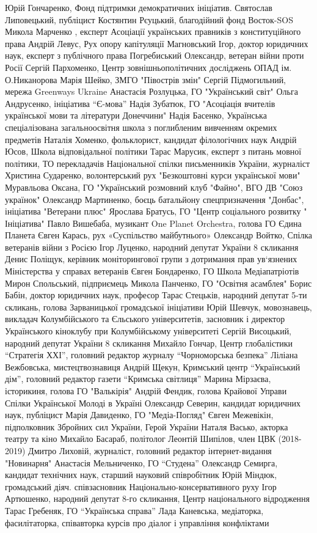 Юрій Гончаренко, Фонд підтримки демократичних ініціатив.
Святослав Липовецький, публіцист
Костянтин Рєуцький, благодійний фонд Восток-SOS
Микола Марченко , експерт Асоціації українських правників з конституційного права
Андрій Левус, Рух опору капітуляції
Магновський Ігор, доктор юридичних наук, експерт з публічного права
Погребиський Олександр, ветеран війни проти Росії
Сергій Пархоменко, Центр зовнішньополітичних досліджень ОПАД ім. О.Никанорова
Марія Шейко, ЗМГО "Півострів змін"
Сергій Підмогильний, мережа Greenways Ukraine
Анастасія Розлуцька, ГО "Український світ"
Ольга Андрусенко, ініціатива “Є-мова”
Надія Зубатюк, ГО "Асоціація вчителів української мови та літератури Донеччини"
Надія Басенко, Українська спеціалізована загальноосвітня школа з поглибленим вивченням окремих предметів
Наталія Хоменко, фольклорист, кандидат філологічних наук
Андрій Юсов, Школа відповідальної політики
Тарас Марусик, експерт з питань мовної політики, ТО перекладачів Національної спілки письменників України, журналіст
Христина Сударенко, волонтерський рух "Безкоштовні курси української мови"
Муравльова Оксана, ГО "Український розмовний клуб "Файно", ВГО ДВ "Союз українок"
Олександр Мартиненко, боєць батальйону спецпризначення "Донбас", ініціатива "Ветерани плюс"
Ярослава Братусь, ГО "Центр соціального розвитку " Ініціатива"
Павло Вишебаба, музикант One Planet Orchestra, голова ГО Єдина Планета
Євген Карась, рух «Суспільство майбутнього»
Олександр Войтко, Спілка ветеранів війни з Росією
Ігор Луценко, народний депутат України 8 скликання
Денис Поліщук, керівник моніторингової групи з дотримання прав ув‘язнених Міністерства у справах ветеранів
Євген Бондаренко, ГО Школа Медіапатріотів
Мирон Спольський, підприємець
Микола Панченко, ГО "Освітня асамблея"
Борис Бабін, доктор юридичних наук, професор
Тарас Стецьків, народний депутат 5-ти скликань, голова Зарваницької громадської ініціативи
Юрій Шевчук, мовознавець, викладач Колумбійського та Єльського університетів, засновник і директор Українського кіноклубу при Колумбійському університеті
Сергій Висоцький, народний депутат України 8 скликання
Михайло Гончар, Центр глобалістики “Стратегія ХХІ”, головний редактор журналу “Чорноморська безпека”
Ліліана Вежбовська, мистецтвознавиця
Андрій Щекун, Кримський центр “Український дім”, головний редактор газети “Кримська світлиця”
Марина Мірзаєва, історикиня, голова ГО "Валькірія"
Андрій Фендик, голова Крайової Управи Спілки Української Молоді в Україні
Олександр Северин, кандидат юридичних наук, публіцист
Марія Давиденко, ГО "Медіа-Погляд"
Євген Межевікін, підполковник Збройних сил України, Герой України
Наталя Васько, акторка театру та кіно
Михайло Басараб, політолог
Леонтій Шипілов, член ЦВК (2018-2019)
Дмитро Лиховій, журналіст, головний редактор інтернет-видання "Новинарня"
Анастасія Мельниченко, ГО “Студена”
Олександр Семирга, кандидат технічних наук, старший науковий співробітник
Юрій Міндюк, громадський діяч. співзасновник Національно-консервативного руху
Ігор Артюшенко, народний депутат 8-го скликання, Центр національного відродження
Тарас Гребеняк, ГО “Українська справа”
Лада Каневська, медіаторка, фасилітаторка, співавторка курсів про діалог і управління конфліктами
